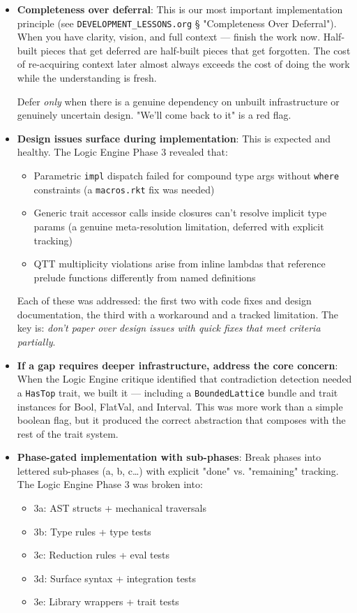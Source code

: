 \documentclass[11pt]{article}
\begin{document}
\begin{itemize}
\item \textbf{Completeness over deferral}: This is our most important implementation
principle (see \texttt{DEVELOPMENT\_LESSONS.org} § "Completeness Over Deferral").
When you have clarity, vision, and full context --- finish the work now.
Half-built pieces that get deferred are half-built pieces that get
forgotten. The cost of re-acquiring context later almost always exceeds
the cost of doing the work while the understanding is fresh.

Defer \emph{only} when there is a genuine dependency on unbuilt infrastructure
or genuinely uncertain design. "We'll come back to it" is a red flag.

\item \textbf{Design issues surface during implementation}: This is expected and
healthy. The Logic Engine Phase 3 revealed that:
\begin{itemize}
\item Parametric \texttt{impl} dispatch failed for compound type args without
\texttt{where} constraints (a \texttt{macros.rkt} fix was needed)
\item Generic trait accessor calls inside closures can't resolve implicit
type params (a genuine meta-resolution limitation, deferred with
explicit tracking)
\item QTT multiplicity violations arise from inline lambdas that reference
prelude functions differently from named definitions
\end{itemize}

Each of these was addressed: the first two with code fixes and design
documentation, the third with a workaround and a tracked limitation.
The key is: \emph{don't paper over design issues with quick fixes that meet
criteria partially}.

\item \textbf{If a gap requires deeper infrastructure, address the core concern}:
When the Logic Engine critique identified that contradiction detection
needed a \texttt{HasTop} trait, we built it --- including a \texttt{BoundedLattice}
bundle and trait instances for Bool, FlatVal, and Interval. This was
more work than a simple boolean flag, but it produced the correct
abstraction that composes with the rest of the trait system.

\item \textbf{Phase-gated implementation with sub-phases}: Break phases into
lettered sub-phases (a, b, c\ldots{}) with explicit "done" vs.
"remaining" tracking. The Logic Engine Phase 3 was broken into:
\begin{itemize}
\item 3a: AST structs + mechanical traversals
\item 3b: Type rules + type tests
\item 3c: Reduction rules + eval tests
\item 3d: Surface syntax + integration tests
\item 3e: Library wrappers + trait tests
\end{itemize}


\end{itemize}
\end{document}
